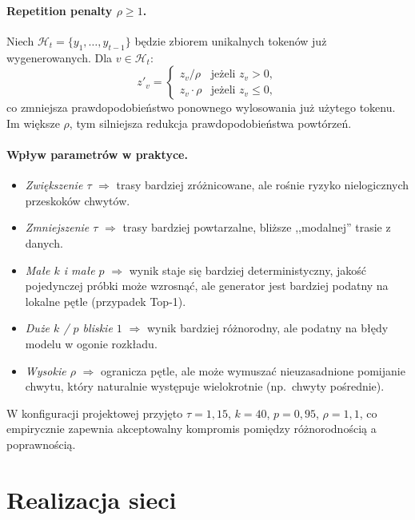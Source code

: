 \documentclass[12pt,a4paper]{article}
\begin{document}
\paragraph{Repetition penalty $\rho \ge 1$.}
Niech $\mathcal{H}_t = \{y_1,\dots,y_{t-1}\}$ będzie zbiorem unikalnych tokenów już wygenerowanych. Dla $v \in \mathcal{H}_t$:
\begin{equation}
z'_v = \begin{cases} z_v / \rho & \text{jeżeli } z_v > 0, \\ z_v \cdot \rho & \text{jeżeli } z_v \le 0, \end{cases}
\end{equation}
co zmniejsza prawdopodobieństwo ponownego wylosowania już użytego tokenu. Im większe $\rho$, tym silniejsza redukcja prawdopodobieństwa powtórzeń.

\paragraph{Wpływ parametrów w praktyce.}
\begin{itemize}[leftmargin=1.5em]
    \item \emph{Zwiększenie $\tau$} $\Rightarrow$ trasy bardziej zróżnicowane, ale rośnie ryzyko nielogicznych przeskoków chwytów.
    \item \emph{Zmniejszenie $\tau$} $\Rightarrow$ trasy bardziej powtarzalne, bliższe ,,modalnej'' trasie z danych.
    \item \emph{Małe $k$ i małe $p$} $\Rightarrow$ wynik staje się bardziej deterministyczny, jakość pojedynczej próbki może wzrosnąć, ale generator jest bardziej podatny na lokalne pętle (przypadek Top-1).
    \item \emph{Duże $k$ / $p$ bliskie $1$} $\Rightarrow$ wynik bardziej różnorodny, ale podatny na błędy modelu w ogonie rozkładu.
    \item \emph{Wysokie $\rho$} $\Rightarrow$ ogranicza pętle, ale może wymuszać nieuzasadnione pomijanie chwytu, który naturalnie występuje wielokrotnie (np.\ chwyty pośrednie).
\end{itemize}
W konfiguracji projektowej przyjęto $\tau = 1{,}15$, $k = 40$, $p = 0{,}95$, $\rho = 1{,}1$, co empirycznie zapewnia akceptowalny kompromis pomiędzy różnorodnością a poprawnością.

\section{Realizacja sieci}
\end{document}
